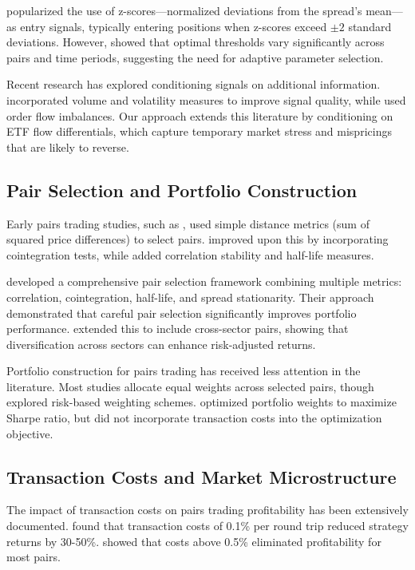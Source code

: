 \documentclass[12pt]{article}
\begin{document}
\citet{vidyamurthy2004pairs} popularized the use of z-scores—normalized deviations from the spread's mean—as entry signals, typically entering positions when z-scores exceed $\pm 2$ standard deviations. However, \citet{do2006pairs} showed that optimal thresholds vary significantly across pairs and time periods, suggesting the need for adaptive parameter selection.

Recent research has explored conditioning signals on additional information. \citet{chen2012pairs} incorporated volume and volatility measures to improve signal quality, while \citet{avellaneda2010statistical} used order flow imbalances. Our approach extends this literature by conditioning on ETF flow differentials, which capture temporary market stress and mispricings that are likely to reverse.

\subsection{Pair Selection and Portfolio Construction}

Early pairs trading studies, such as \citet{gatev2006pairs}, used simple distance metrics (sum of squared price differences) to select pairs. \citet{do2006pairs} improved upon this by incorporating cointegration tests, while \citet{rad2016pairs} added correlation stability and half-life measures.

\citet{caldeira2013pairs} developed a comprehensive pair selection framework combining multiple metrics: correlation, cointegration, half-life, and spread stationarity. Their approach demonstrated that careful pair selection significantly improves portfolio performance. \citet{liu2017pairs} extended this to include cross-sector pairs, showing that diversification across sectors can enhance risk-adjusted returns.

Portfolio construction for pairs trading has received less attention in the literature. Most studies allocate equal weights across selected pairs, though \citet{caldeira2013pairs} explored risk-based weighting schemes. \citet{avellaneda2010statistical} optimized portfolio weights to maximize Sharpe ratio, but did not incorporate transaction costs into the optimization objective.

\subsection{Transaction Costs and Market Microstructure}

The impact of transaction costs on pairs trading profitability has been extensively documented. \citet{perlin2009evaluation} found that transaction costs of 0.1\% per round trip reduced strategy returns by 30-50\%. \citet{do2006pairs} showed that costs above 0.5\% eliminated profitability for most pairs.
\end{document}
